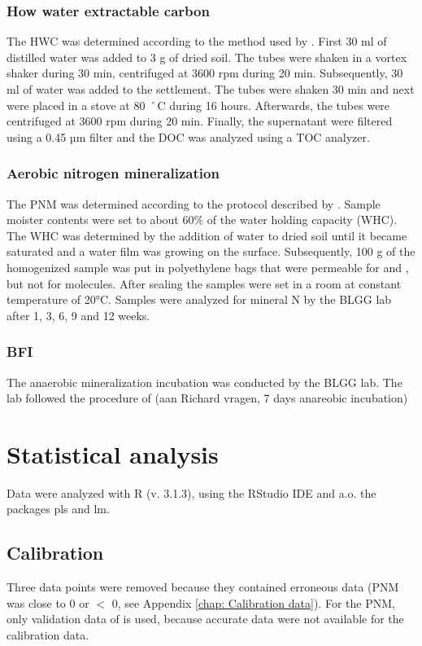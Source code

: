 \documentclass[10pt,twoside,dutch,english]{report}
\begin{document}
\subsubsection{How water extractable carbon}
The HWC was determined according to the method used by \citet{Ghani2003}. First 30 ml of distilled water was added to  3 g of dried soil. The tubes were shaken in a vortex shaker during 30 min, centrifuged at 3600 rpm during 20 min. Subsequently, 30 ml of water was added to the settlement. The tubes were shaken 30 min and next were placed in a stove at 80 ˚C during 16 hours. Afterwards, the tubes were centrifuged at 3600 rpm during 20 min. Finally, the supernatant were filtered using a 0.45 µm filter and the DOC was analyzed using a TOC analyzer. 

\subsubsection{Aerobic nitrogen mineralization}
The PNM was determined according to the protocol described by \citet{Ros2014}. Sample moister contents were set to about 60\% of the water holding capacity (WHC). The WHC was determined by the addition of water to dried soil until it became saturated and a water film was growing on the surface. Subsequently, 100 g of the homogenized sample was put in polyethylene bags that were permeable for  and  , but not for  molecules. After sealing the samples were set in a room at constant temperature of 20°C. Samples were analyzed for mineral N by the BLGG lab after 1, 3, 6, 9 and 12 weeks. 

\subsubsection{BFI}
The anaerobic mineralization incubation was conducted by the BLGG lab. The lab followed the procedure of (aan Richard vragen, 7 days anareobic incubation)



\section{Statistical analysis}
Data were analyzed with R (v. 3.1.3), using the RStudio IDE and a.o. the packages pls and lm. 
\subsection{Calibration}
Three data points were removed because they contained erroneous data (PNM was close to 0 or $<$ 0, see Appendix \ref{chap: Calibration data}). For the PNM, only validation data of  is used, because accurate  data were not available for the calibration data. 
\end{document}
